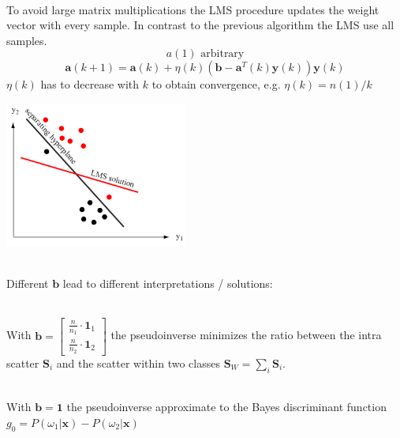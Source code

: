     \begin{minipage}{12cm}
    \\
    To avoid large matrix multiplications the LMS procedure updates the weight vector with every sample. 
    In contrast to the previous algorithm the LMS use all samples.\\
    $$a(1) \text{ arbitrary}$$
  $$\bm a(k+1)=\bm a(k)+\eta(k)\left(\bm b-\bm a^T(k)\bm y(k)\right)\bm y(k)$$
    $\eta(k)$ has to decrease with $k$ to obtain convergence, e.g. $\eta(k)=n(1)/k$\\
    \end{minipage}
      \hspace{8mm}
      \begin{minipage}{6cm}
         \includegraphics[width=6cm]{./images/LMS.png}
    \end{minipage}\\
    
    Different $\bm b$ lead to different interpretations / solutions:\\
    \begin{liste}
      \item 
        \\
        With $\bm b=\begin{bmatrix}
        \frac{n}{n_1} \cdot \bm 1_1\\
        \frac{n}{n_2} \cdot \bm 1_2
        \end{bmatrix}$ the pseudoinverse minimizes the ratio between the intra scatter $\bm S_i$ and the
        scatter within two classes $\bm S_W = \sum_i \bm S_i$.\\
      \item 
  \\
    With  $\bm b=\bm 1$ the pseudoinverse approximate to the Bayes discriminant function $g_0 = P(\omega_1 | \bm x) - P(\omega_2 | \bm x)$\\
    \end{liste}
    
